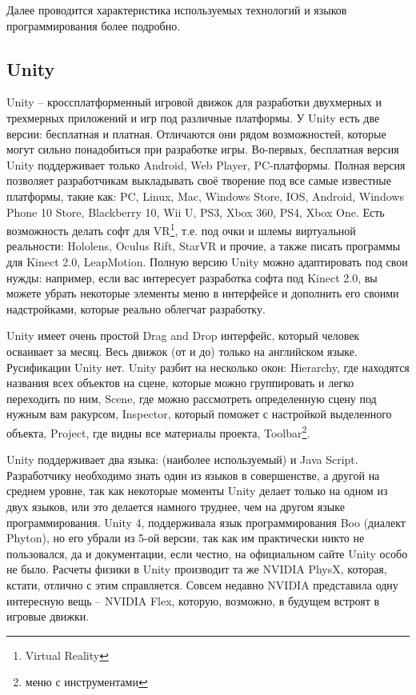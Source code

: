 Далее проводится характеристика используемых технологий и языков программирования более
подробно.


\subsection{Unity}

Unity -- кроссплатформенный игровой движок для разработки двухмерных и трехмерных приложений и игр под различные платформы. У Unity есть две версии: бесплатная и платная. Отличаются они рядом возможностей, которые могут сильно понадобиться при разработке игры. Во-первых, бесплатная версия Unity поддерживает только Android, Web Player, PC-платформы. Полная версия позволяет разработчикам выкладывать своё творение под все самые известные платформы, такие как: PC, Linux, Mac, Windows Store, IOS, Android, Windows Phone 10 Store, Blackberry 10, Wii U, PS3, Xbox 360, PS4, Xbox One. Есть возможность делать софт для VR\footnote{Virtual Reality}, т.е. под очки и шлемы виртуальной реальности: Hololens, Oculus Rift, StarVR и прочие, а также писать программы для Kinect 2.0, LeapMotion. Полную версию Unity можно адаптировать под свои нужды: например, если вас интересует разработка софта под Kinect 2.0, вы можете убрать некоторые элементы меню в интерфейсе и дополнить его своими надстройками, которые реально облегчат разработку.

Unity имеет очень простой Drag and Drop интерфейс, который человек осваивает за месяц. Весь движок (от и до) только на английском языке. Русификации Unity нет. Unity разбит на несколько окон: Hierarchy, где находятся названия всех объектов на сцене, которые можно группировать и легко переходить по ним, Scene, где можно рассмотреть определенную сцену под нужным вам ракурсом, Inspector, который поможет с настройкой выделенного объекта, Project, где видны все материалы проекта, Toolbar\footnote{меню с инструментами}.

Unity поддерживает два языка: \CSharp (наиболее используемый) и Java \linebreak Script. Разработчику необходимо знать один из языков в совершенстве, а другой на среднем уровне, так как некоторые моменты Unity делает только на одном из двух языков, или это делается намного труднее, чем на другом языке программирования. Unity 4, поддерживала язык программирования Boo (диалект Phyton), но его убрали из 5-ой версии, так как им практически никто не пользовался, да и документации, если честно, на официальном сайте Unity особо не было. Расчеты физики в Unity производит та же NVIDIA PhysX, которая, кстати, отлично с этим справляется. Совсем недавно NVIDIA представила одну интересную вещь -- NVIDIA Flex, которую, возможно, в будущем встроят в игровые движки.

